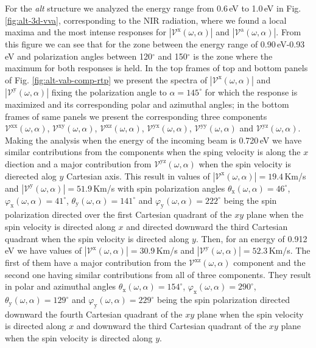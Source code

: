 \documentclass[prb,11pt,tightenlines,twocolumn,aps]{revtex4-1}
\begin{document}
{\color{red} For the \emph{alt} structure we analyzed the energy range from
0.6\,eV to 1.0\,eV in Fig. \ref{fig:alt-3d-vva}, corresponding to the NIR
radiation, where we found a local maxima and the most intense responses for
$|\mathcal{V}^{\mathrm{x}}(\omega,\alpha)|$ and
$|\mathcal{V}^{\mathrm{a}}(\omega,\alpha)|$.}
%
From this figure we can see that for the zone between the energy range of
0.90\,eV-0.93\,eV and polarization angles between 120$^{\circ}$ and
150$^{\circ}$ is the zone where the maximum for both responses is held.
In the top frames of top and bottom panels of Fig. \ref{fig:alt-vab-comp-rtp}
we present the spectra of $|\mathcal{V}^{\mathrm{x}}(\omega,\alpha)|$ and
$|\mathcal{V}^{\mathrm{y}}(\omega,\alpha)|$ fixing the polarization angle to
$\alpha=145^{\circ}$ for which the response is maximized and its corresponding
polar and azimuthal angles; in the bottom frames of same panels we present the
corresponding three components $\mathcal{V}^{\mathrm{xx}}(\omega,\alpha)$,
$\mathcal{V}^{\mathrm{xy}}(\omega,\alpha)$,
$\mathcal{V}^{\mathrm{xz}}(\omega,\alpha)$,
$\mathcal{V}^{\mathrm{yx}}(\omega,\alpha)$,
$\mathcal{V}^{\mathrm{yy}}(\omega,\alpha)$ and
$\mathcal{V}^{\mathrm{yz}}(\omega,\alpha)$.
% 
{\color{red} Making the analysis when the energy of the incoming beam is
0.720\,eV we have similar contributions from the components when the sping
velocity is along the $x$ diection and a major contribution from
$\mathcal{V}^{\mathrm{yz}}(\omega,\alpha)$ when the spin velocity is dierected
alog $y$ Cartesian axis. This result in values of
$|\mathcal{V}^{\mathrm{x}}(\omega,\alpha)| = 19.4$\,Km/s and
$|\mathcal{V}^{\mathrm{y}}(\omega,\alpha)| = 51.9$\,Km/s with spin polarization
angles $\theta_{\mathrm{x}}(\omega,\alpha) = 46^{\circ}$,
$\varphi_{\mathrm{x}}(\omega,\alpha) = 41^{\circ}$,
$\theta_{\mathrm{y}}(\omega,\alpha) = 141^{\circ}$ and
$\varphi_{\mathrm{y}}(\omega,\alpha) = 222^{\circ}$ being the spin polarization
directed over the first Cartesian quadrant of the $xy$ plane when the spin
velocity is directed along $x$ and directed downward the third Cartesian
quadrant when the spin velocity is directed along $y$.
% 
Then, for an energy of 0.912\,eV we have values of
$|\mathcal{V}^{\mathrm{x}}(\omega,\alpha)|=30.9$\,Km/s and
$|\mathcal{V}^{\mathrm{y}}(\omega,\alpha)| = 52.3$\,Km/s. The first of them
have a major contribution from the $\mathcal{V}^{\mathrm{xz}}(\omega,\alpha)$
component and the second one having similar contributions from all of three
components. They result in polar and azimuthal angles
$\theta_{\mathrm{x}}(\omega,\alpha) = 154^{\circ}$,
$\varphi_{\mathrm{x}}(\omega,\alpha) = 290^{\circ}$,
$\theta_{\mathrm{y}}(\omega,\alpha) = 129^{\circ}$ and
$\varphi_{\mathrm{y}}(\omega,\alpha) = 229^{\circ}$ being the spin polarization
directed downward the fourth Cartesian quadrant of the $xy$ plane when the spin
velocity is directed along $x$ and downward the third Cartesian quadrant of the
$xy$ plane when the spin velocity is directed along $y$.}
\end{document}
